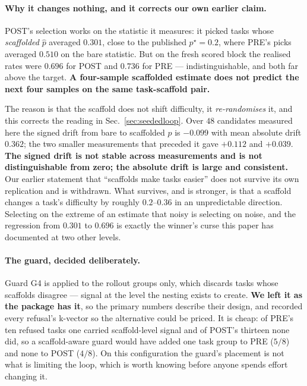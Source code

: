 \paragraph{Why it changes nothing, and it corrects our own earlier claim.}
POST's selection works on the statistic it measures: it picked tasks whose \emph{scaffolded}
$\hat p$ averaged $0.301$, close to the published $p^\star=0.2$, where PRE's picks averaged
$0.510$ on the bare statistic. But on the fresh scored block the realised rates were
$0.696$ for POST and $0.736$ for PRE --- indistinguishable, and both far above the target.
\textbf{A four-sample scaffolded estimate does not predict the next four samples on the same
task-scaffold pair.}

The reason is that the scaffold does not shift difficulty, it \emph{re-randomises} it, and this
corrects the reading in Sec.~\ref{sec:seededloop}. Over $48$ candidates measured here the
signed drift from bare to scaffolded $\hat p$ is $\mathbf{-0.099}$ with mean absolute drift
$\mathbf{0.362}$; the two smaller measurements that preceded it gave $+0.112$ and $+0.039$.
\textbf{The signed drift is not stable across measurements and is not distinguishable from zero;
the absolute drift is large and consistent.} Our earlier statement that ``scaffolds make tasks
easier'' does not survive its own replication and is withdrawn. What survives, and is stronger,
is that a scaffold changes a task's difficulty by roughly $0.2$--$0.36$ in an unpredictable
direction. Selecting on the extreme of an estimate that noisy is selecting on noise, and the
regression from $0.301$ to $0.696$ is exactly the winner's curse this paper has documented at
two other levels.

\paragraph{The guard, decided deliberately.} Guard G4 is applied to the rollout groups only,
which discards tasks whose scaffolds disagree --- signal at the level the nesting exists to
create. \textbf{We left it as the package has it}, so the primary numbers describe their design,
and recorded every refusal's k-vector so the alternative could be priced. It is cheap: of PRE's
ten refused tasks one carried scaffold-level signal and of POST's thirteen none did, so a
scaffold-aware guard would have added one task group to PRE ($5/8$) and none to POST ($4/8$).
On this configuration the guard's placement is not what is limiting the loop, which is worth
knowing before anyone spends effort changing it.

